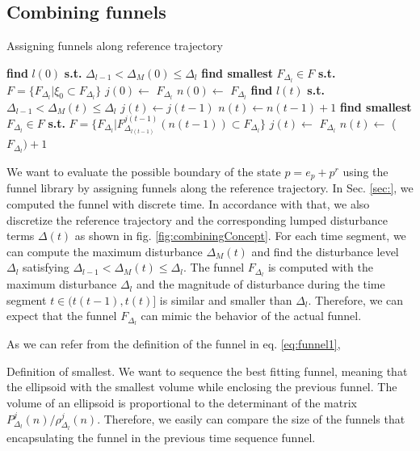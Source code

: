 \documentclass[letterpaper, 10 pt, conference]{ieeeconf}  %
\begin{document}
\subsection{Combining funnels}
\begin{algorithm}
  \caption{Assigning funnels along reference trajectory
    \label{alg:funnel}}
  \begin{algorithmic}[1]
    \Statex
	\State \textbf{find }$l(0)$\textbf{ s.t.} $\Delta_{l-1} < \Delta_M(0) \leq \Delta_l$ 
	\State \textbf{find smallest} $F_{\Delta_l} \in {F}$ \textbf{s.t.} ${F}=\{F_{\Delta_l}|\xi_0 \subset F_{\Delta_l}\}$
\State $j(0) \gets $ $F_{\Delta_l}$
\State $n(0) \gets $ $F_{\Delta_l}$
				\State \textbf{find }$l(t)$\textbf{ s.t. }$\Delta_{l-1} < \Delta_M(t) \leq \Delta_l$
				\State $j(t) \gets j(t-1)$ 
				\State $n(t) \gets n(t-1)+1$
				\Else
				\State \textbf{find smallest} $F_{\Delta_l} \in {F}$ \textbf{s.t.} 
				\State ${F}=\{F_{\Delta_l}|F_{\Delta_{l(t-1)}}^{j(t-1)}(n(t-1)) \subset F_{\Delta_l}\}$
				\State $j(t) \gets$ $F_{\Delta_l}$ 
				\State $n(t) \gets$ ($F_{\Delta_l}) + 1$
				\EndIf
      \EndFor
      \State {}
    \EndFunction
  \end{algorithmic}
\end{algorithm}
We want to evaluate the possible boundary of the state $p = e_p + p^r$ using the funnel library by assigning funnels along the reference trajectory.
In Sec. \ref{sec:}, we computed the funnel with discrete time.
In accordance with that, we also discretize the reference trajectory and the corresponding lumped disturbance terms $\Delta(t)$ as shown in fig. \ref{fig:combiningConcept}. 
For each time segment, we can compute the maximum disturbance $\Delta_M(t)$ and find the disturbance level $\Delta_l$ satisfying $\Delta_{l-1} < \Delta_M(t) \leq \Delta_l$. 
The funnel $F_{\Delta_l}$ is computed with the maximum disturbance $\Delta_l$ and the magnitude of disturbance during the time segment $t \in (t(t-1),t(t)]$ is similar and smaller than $\Delta_l$. Therefore, we can expect that the funnel $F_{\Delta_l}$ can mimic the behavior of the actual funnel. 

As we can refer from the definition of the funnel in eq. \eqref{eq:funnel1},

Definition of smallest. 
We want to sequence the best fitting funnel, meaning that the ellipsoid with the smallest volume while enclosing the previous funnel.
The volume of an ellipsoid is proportional to the determinant of the matrix $P_{\Delta_l}^j(n)/\rho_{\Delta_l}^j(n)$.
Therefore, we easily can compare the size of the funnels that encapsulating the funnel in the previous time sequence funnel.
\end{document}

